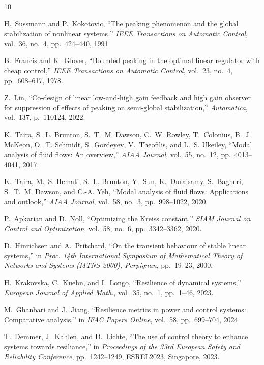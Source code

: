 \documentclass[12pt, a4paper,reqno]{amsart}
\theoremstyle{definition}
\begin{document}
\begin{thebibliography}{10}

H.~Sussmann and P.~Kokotovic, ``The peaking phenomenon and the global
  stabilization of nonlinear systems,'' {\em IEEE Transactions on Automatic
  Control}, vol.~36, no.~4, pp.~424--440, 1991.

B.~Francis and K.~Glover, ``Bounded peaking in the optimal linear regulator
  with cheap control,'' {\em IEEE Transactions on Automatic Control}, vol.~23,
  no.~4, pp.~608--617, 1978.

Z.~Lin, ``Co-design of linear low-and-high gain feedback and high gain observer
  for suppression of effects of peaking on semi-global stabilization,'' {\em
  Automatica}, vol.~137, p.~110124, 2022.

K.~Taira, S.~L. Brunton, S.~T.~M. Dawson, C.~W. Rowley, T.~Colonius, B.~J.
  McKeon, O.~T. Schmidt, S.~Gordeyev, V.~Theofilis, and L.~S. Ukeiley, ``Modal
  analysis of fluid flows: An overview,'' {\em AIAA Journal}, vol.~55, no.~12,
  pp.~4013--4041, 2017.

K.~Taira, M.~S. Hemati, S.~L. Brunton, Y.~Sun, K.~Duraisamy, S.~Bagheri,
  S.~T.~M. Dawson, and C.-A. Yeh, ``Modal analysis of fluid flows: Applications
  and outlook,'' {\em AIAA Journal}, vol.~58, no.~3, pp.~998--1022, 2020.

P.~Apkarian and D.~Noll, ``Optimizing the {K}reiss constant,'' {\em SIAM
  Journal on Control and Optimization}, vol.~58, no.~6, pp.~3342--3362, 2020.

D.~Hinrichsen and A.~Pritchard, ``On the transient behaviour of stable linear
  systems,'' in {\em Proc. 14th International Symposium of Mathematical Theory
  of Networks and Systems (MTNS 2000), Perpignan}, pp.~19--23, 2000.

H.~Krakovska, C.~Kuehn, and I.~Longo, ``Resilience of dynamical systems,'' {\em
  European Journal of Applied Math.}, vol.~35, no.~1, pp.~1--46, 2023.

M.~Ghanbari and J.~Jiang, ``Resilience metrics in power and control systems:
  Comparative analysis,'' in {\em IFAC Papers Online}, vol.~58, pp.~699--704,
  2024.

T.~Demmer, J.~Kahlen, and D.~Lichte, ``The use of control theory to enhance
  systems towards resiliance,'' in {\em Proceedings of the 33rd European Safety
  and Reliability Conference}, pp.~1242--1249, ESREL2023, Singapore, 2023.


\end{thebibliography}
\end{document}
